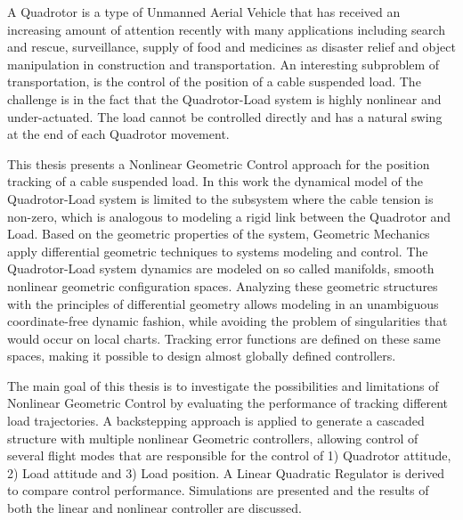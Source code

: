 
A Quadrotor is a type of Unmanned Aerial Vehicle that has received an increasing amount of attention recently with many applications including search and rescue, surveillance, supply of food and medicines as disaster relief and object manipulation in construction and transportation.
An interesting subproblem of transportation, is the control of the position of a cable suspended load. The challenge is in the fact that the Quadrotor-Load system is highly nonlinear and under-actuated. The load cannot be controlled directly and has a natural swing at the end of each Quadrotor movement. 

This thesis presents a Nonlinear Geometric Control approach for the position tracking of a cable suspended load. In this work the dynamical model of the Quadrotor-Load system is limited to the subsystem where the cable tension is non-zero, which is analogous to modeling a rigid link between the Quadrotor and Load.
Based on the geometric properties of the system, Geometric Mechanics apply differential geometric techniques to systems modeling and control.
The Quadrotor-Load system dynamics are modeled on so called manifolds, smooth nonlinear geometric configuration spaces. 
Analyzing these geometric structures with the principles of differential geometry allows modeling in an unambiguous coordinate-free dynamic fashion, while avoiding the problem of singularities that would occur on local charts. Tracking error functions are defined on these same spaces, making it possible to design almost globally defined controllers.

The main goal of this thesis is to investigate the possibilities and limitations of Nonlinear Geometric Control by evaluating the performance of tracking different load trajectories. 
A backstepping approach is applied to generate a cascaded structure with multiple nonlinear Geometric controllers, allowing control of several flight modes that are responsible for the control of 1) Quadrotor attitude, 2) Load attitude and 3) Load position. 
A Linear Quadratic Regulator is derived to compare control performance. Simulations are presented and the results of both the linear and nonlinear controller are discussed. 



%
%
%

